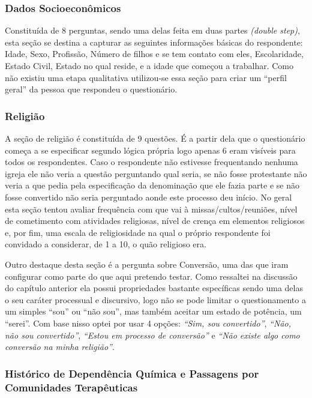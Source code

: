 \documentclass[
	12pt,				%
	oneside,			%
	a4paper,			%
	sumario=tradicional,
	english,			%
	brazil				%
	]{abntex2}
\begin{document}
\hypertarget{dados-socioeconuxf4micos}{%
\subsubsection{Dados Socioeconômicos}\label{dados-socioeconuxf4micos}}

Constituída de 8 perguntas, sendo uma delas feita em duas partes \emph{(double step)}, esta seção se destina a capturar as seguintes informações básicas do respondente: Idade, Sexo, Profissão, Número de filhos e se tem contato com eles, Escolaridade, Estado Civil, Estado no qual reside, e a idade que começou a trabalhar. Como não existiu uma etapa qualitativa utilizou-se essa seção para criar um ``perfil geral'' da pessoa que respondeu o questionário.

\hypertarget{religiuxe3o}{%
\subsubsection{Religião}\label{religiuxe3o}}

A seção de religião é constituída de 9 questões. É a partir dela que o questionário começa a se especificar segundo lógica própria logo apenas 6 eram visíveis para todos os respondentes. Caso o respondente não estivesse frequentando nenhuma igreja ele não veria a questão perguntando qual seria, se não fosse protestante não veria a que pedia pela especificação da denominação que ele fazia parte e se não fosse convertido não seria perguntado aonde este processo deu início. No geral esta seção tentou avaliar frequência com que vai à missas/cultos/reuniões, nível de cometimento com atividades religiosas, nível de crença em elementos religiosos e, por fim, uma escala de religiosidade na qual o próprio respondente foi convidado a considerar, de 1 a 10, o quão religioso era.

Outro destaque desta seção é a pergunta sobre Conversão, uma das que iram configurar como parte do que aqui pretendo testar. Como ressaltei na discussão do capítulo anterior ela possui propriedades bastante específicas sendo uma delas o seu caráter processual e discursivo, logo não se pode limitar o questionamento a um simples ``sou'' ou ``não sou'', mas também aceitar um estado de potência, um ``serei''. Com base nisso optei por usar 4 opções: \emph{``Sim, sou convertido''}, \emph{``Não, não sou convertido''}, \emph{``Estou em processo de conversão''} e \emph{``Não existe algo como conversão na minha religião''}.

\hypertarget{histuxf3rico-de-dependuxeancia-quuxedmica-e-passagens-por-comunidades-terapuxeauticas}{%
\subsubsection{Histórico de Dependência Química e Passagens por Comunidades Terapêuticas}\label{histuxf3rico-de-dependuxeancia-quuxedmica-e-passagens-por-comunidades-terapuxeauticas}}
\end{document}
